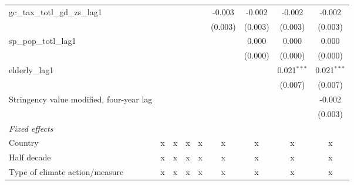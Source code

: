 \begin{tabular}{lcccccccc}
   gc\_tax\_totl\_gd\_zs\_lag1                                   &                &                &                &                & -0.003        & -0.002        & -0.002        & -0.002\\   
                                                                 &                &                &                &                & (0.003)       & (0.003)       & (0.003)       & (0.003)\\   
   sp\_pop\_totl\_lag1                                           &                &                &                &                &               & 0.000         & 0.000         & 0.000\\   
                                                                 &                &                &                &                &               & (0.000)       & (0.000)       & (0.000)\\   
   elderly\_lag1                                                 &                &                &                &                &               &               & 0.021$^{***}$ & 0.021$^{***}$\\   
                                                                 &                &                &                &                &               &               & (0.007)       & (0.007)\\   
   Stringency value modified, four-year lag                      &                &                &                &                &               &               &               & -0.002\\   
                                                                 &                &                &                &                &               &               &               & (0.003)\\   
   \emph{Fixed effects}\\
   Country                                                       & x              & x              & x              & x              & x             & x             & x             & x\\  
   Half decade                                                   & x              & x              & x              & x              & x             & x             & x             & x\\  
   Type of climate action/measure                                & x              & x              & x              & x              & x             & x             & x             & x\\  

\end{tabular}
